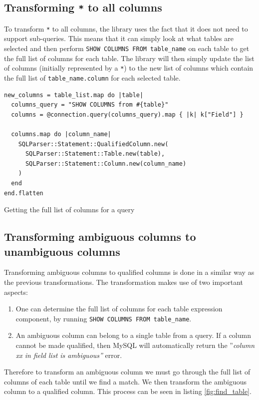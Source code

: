 \subsection{Transforming \texttt{*} to all columns}
To transform \texttt{*} to all columns, the library uses the fact that it does not need to support sub-queries. This means that it can simply look at what tables are selected and then perform \texttt{SHOW COLUMNS FROM table_name} on each table to get the full list of columns for each table. The library will then simply update the list of columns (initially represented by a \texttt{*}) to the new list of columns which contain the full list of \texttt{table\_name.column} for each selected table.

\begin{code}
\begin{verbatim}
new_columns = table_list.map do |table|
  columns_query = "SHOW COLUMNS from #{table}"
  columns = @connection.query(columns_query).map { |k| k["Field"] }

  columns.map do |column_name|
    SQLParser::Statement::QualifiedColumn.new(
      SQLParser::Statement::Table.new(table),
      SQLParser::Statement::Column.new(column_name)
    )
  end
end.flatten
\end{verbatim}
\caption{Getting the full list of columns for a query}
\end{code}

\subsection{Transforming ambiguous columns to unambiguous columns}
Transforming ambiguous columns to qualified columns is done in a similar way as the previous transformations. The transformation makes use of two important aspects:
\begin{enumerate}
    \item One can determine the full list of columns for each table expression component, by running \texttt{SHOW COLUMNS FROM table_name}.
    \item An ambiguous column can belong to a single table from a query. If a column cannot be made qualified, then MySQL will automatically return the ''\textit{column xx in field list is ambiguous''} error.
\end{enumerate}

Therefore to transform an ambiguous column we must go through the full list of columns of each table until we find a match. We then transform the ambiguous column to a qualified column. This process can be seen in listing \ref{fig:find_table}.

